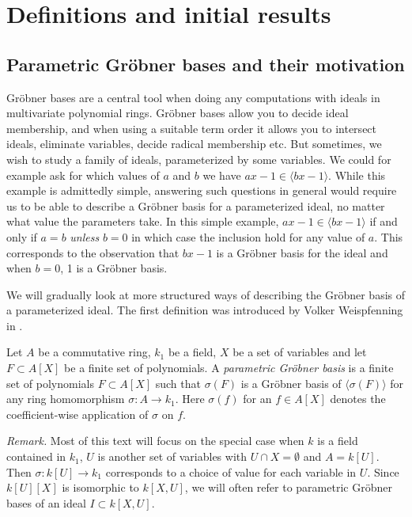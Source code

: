 \section{Definitions and initial results}

\subsection{Parametric Gröbner bases and their motivation}
Gröbner bases are a central tool when doing any computations with ideals in multivariate polynomial rings. Gröbner bases allow you to decide ideal membership, and when using a suitable term order it allows you to intersect ideals, eliminate variables, decide radical membership etc. But sometimes, we wish to study a family of ideals, parameterized by some variables. We could for example ask for which values of $a$ and $b$ we have $ax - 1 \in \langle bx - 1 \rangle$. While this example is admittedly simple, answering such questions in general would require us to be able to describe a Gröbner basis for a parameterized ideal, no matter what value the parameters take. In this simple example, $ax - 1 \in \langle bx - 1 \rangle$ if and only if $a = b$ \textit{unless} $b = 0$ in which case the inclusion hold for any value of $a$. This corresponds to the observation that $bx - 1$ is a Gröbner basis for the ideal and when $b=0$, 1 is a Gröbner basis.

We will gradually look at more structured ways of describing the Gröbner basis of a parameterized ideal. The first definition was introduced by Volker Weispfenning in \cite{Weispfenning}.

\begin{definition}\label{def:par_grb}
  Let $A$ be a commutative ring, $k_{1}$ be a field, $X$ be a set of variables and let $F \subset A[X]$ be a finite set of polynomials. A \textit{parametric Gröbner basis} is a finite set of polynomials $F \subset A[X]$ such that $\sigma(F)$ is a Gröbner basis of $\langle \sigma(F) \rangle$ for any ring homomorphism $\sigma : A \to k_{1}$. Here $\sigma(f)$ for an $f \in A[X]$ denotes the coefficient-wise application of $\sigma$ on $f$.
\end{definition}
\textit{Remark. }Most of this text will focus on the special case when $k$ is a field contained in $k_{1}$, $U$ is another set of variables with $U \cap X = \emptyset$ and $A = k[U]$. Then $\sigma : k[U] \to k_{1}$ corresponds to a choice of value for each variable in $U$. Since $k[U][X]$ is isomorphic to $k[X, U]$, we will often refer to parametric Gröbner bases of an ideal $I \subset k[X, U]$.

